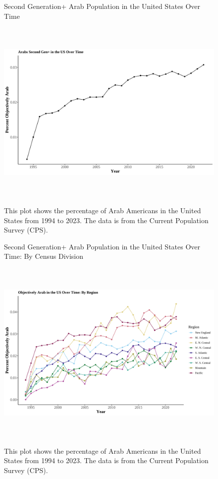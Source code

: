 

\pagebreak
\newpage

\begin{center}
    \begin{figure}[H]
    \caption{Second Generation+ Arab Population in the United States Over Time}
    \includegraphics[width=\textwidth, height=9cm]{figure/01-Arab_all_Obj.png} 
    \label{fig:diag}
    \caption*{\footnotesize{This plot shows the percentage of Arab Americans in the United States from 1994 to 2023. 
    The data is from the Current Population Survey (CPS).}}
    \end{figure}
    \hfill%
\end{center}

\clearpage

\begin{center}
    \begin{figure}[H]
    \caption{Second Generation+ Arab Population in the United States Over Time: By Census Division}
    \includegraphics[width=\textwidth, height=9cm]{figure/02-Arab.png} 
    \label{fig:diag}
    \caption*{\footnotesize{This plot shows the percentage of Arab Americans in the United States from 1994 to 2023. 
    The data is from the Current Population Survey (CPS).}}
    \end{figure}
    \hfill%
\end{center}

